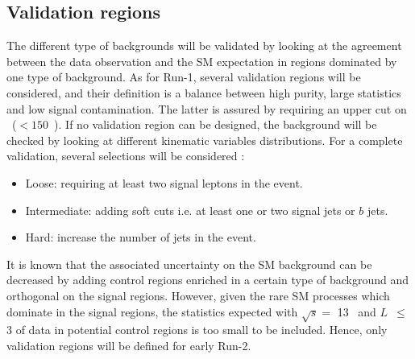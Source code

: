 \subsection{Validation regions}
\label{sec:bkg_VR}
The different type of backgrounds will be validated by looking at the agreement between the data observation and the SM expectation in regions dominated by one type of background. As for Run-1, several validation regions will be considered, and their definition is a balance between high purity, large statistics and low signal contamination. The latter is assured by requiring an upper cut on \met\ 
($<150$~\GeV). If no validation region can be designed, the background will be checked by looking at different kinematic variables distributions. For a complete validation, several selections will be considered :
\begin{itemize}
	\item{Loose: requiring at least two signal leptons in the event.}
	\item{Intermediate: adding soft cuts i.e. at least one or two signal jets or $b$ jets.}
	\item{Hard: increase the number of jets in the event.}
\end{itemize}


It is known that the associated uncertainty on the SM background can be decreased by adding control regions enriched in a certain type of background and orthogonal on the signal regions. However, given the rare SM processes which dominate in the signal regions, the statistics expected with $\sqrt s=$ 13 \TeV\ and $L$~$\le$3 \ifb of data in potential control regions is too small to be included. Hence, only validation regions will be defined for early Run-2.

